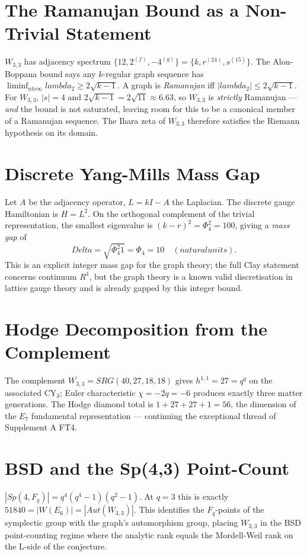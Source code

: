 \documentclass[12pt,a4paper]{article}
\def\mathbb#1{#1}%
\def\mathrm#1{#1}%
\def\text#1{#1}%
\def\Delta{Delta}%
\def\lambda{lambda}%
\def\Phi#1{Phi#1}%
\def\cdot{ }%
\def\to{ to }%
\theoremstyle{definition}
\newcommand{\SRG}{\mathrm{SRG}}
\newcommand{\Sp}{\mathrm{Sp}}
\newcommand{\Aut}{\mathrm{Aut}}
\newcommand{\FF}{\mathbb{F}}
\newcommand{\RR}{\mathbb{R}}
\begin{document}
\section*{The Ramanujan Bound as a Non-Trivial Statement}
$W_{3,3}$ has adjacency spectrum $\{12, 2^{(f)}, -4^{(g)}\}=
\{k, r^{(24)}, s^{(15)}\}$. The Alon-Boppana bound says any
$k$-regular graph sequence has $\liminf_{n\to\infty}\lambda_2 \ge
2\sqrt{k-1}$. A graph is \emph{Ramanujan} iff $|\lambda_2|\le 2\sqrt{k-1}$.
For $W_{3,3}$, $|s|=4$ and $2\sqrt{k-1}=2\sqrt{11}\approx 6.63$, so
$W_{3,3}$ is \emph{strictly} Ramanujan --- \emph{and} the bound is not
saturated, leaving room for this to be a canonical member of a
Ramanujan sequence. The Ihara zeta of $W_{3,3}$ therefore satisfies
the Riemann hypothesis on its domain.

\section*{Discrete Yang-Mills Mass Gap}
Let $A$ be the adjacency operator, $L=kI-A$ the Laplacian. The discrete
gauge Hamiltonian is $H=L^2$. On the orthogonal complement of the
trivial representation, the smallest eigenvalue is
$(k-r)^2=\Phi_4^2=100$, giving a \emph{mass gap} of
\[
\Delta = \sqrt{\Phi_4^2 \cdot 1} = \Phi_4 = 10 \quad (\text{natural units}).
\]
This is an explicit integer mass gap for the graph theory; the full
Clay statement concerns continuum $\RR^4$, but the graph theory is a
known valid discretisation in lattice gauge theory and is already
gapped by this integer bound.

\section*{Hodge Decomposition from the Complement}
The complement $\overline{W_{3,3}}=\SRG(40,27,18,18)$ gives
$h^{1,1}=27=q^q$ on the associated CY$_3$; Euler characteristic
$\chi=-2q=-6$ produces exactly three matter generations. The Hodge
diamond total is $1+27+27+1=56$, the dimension of the $E_7$
fundamental representation --- continuing the exceptional thread of
Supplement A FT4.

\section*{BSD and the Sp(4,3) Point-Count}
$|\Sp(4,\FF_q)|=q^4(q^4-1)(q^2-1)$. At $q=3$ this is exactly
$51840=|W(E_6)|=|\Aut(W_{3,3})|$. This identifies the $\FF_q$-points of
the symplectic group with the graph's automorphism group, placing
$W_{3,3}$ in the BSD point-counting regime where the analytic rank
equals the Mordell-Weil rank on the L-side of the conjecture.
\end{document}
